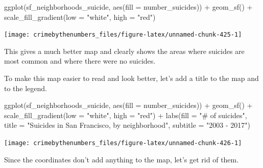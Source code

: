 \documentclass[
]{krantz}
\makeatletter
\newenvironment{Shaded}{\begin{snugshade}}{\end{snugshade}}
\newcommand{\AttributeTok}[1]{\textcolor[rgb]{0.61,0.61,0.61}{#1}}
\newcommand{\FunctionTok}[1]{\textcolor[rgb]{0,0,0}{#1}}
\newcommand{\NormalTok}[1]{#1}
\newcommand{\SpecialCharTok}[1]{\textcolor[rgb]{0,0,0}{#1}}
\newcommand{\StringTok}[1]{\textcolor[rgb]{0.5,0.5,0.5}{#1}}
\newenvironment{kframe}{%
\medskip{}
\setlength{\fboxsep}{.8em}
 \def\at@end@of@kframe{}%
 \ifinner\ifhmode%
  \def\at@end@of@kframe{\end{minipage}}%
  \begin{minipage}{\columnwidth}%
 \fi\fi%
 \def\FrameCommand##1{\hskip\@totalleftmargin \hskip-\fboxsep
 \colorbox{shadecolor}{##1}\hskip-\fboxsep
     \hskip-\linewidth \hskip-\@totalleftmargin \hskip\columnwidth}%
 \MakeFramed {\advance\hsize-\width
   \@totalleftmargin\z@ \linewidth\hsize
   \@setminipage}}%
 {\par\unskip\endMakeFramed%
 \at@end@of@kframe}
\renewenvironment{Shaded}{\begin{kframe}}{\end{kframe}}
\makeatother
\begin{document}
\begin{Shaded}
\begin{Highlighting}[]
\FunctionTok{ggplot}\NormalTok{(sf\_neighborhoods\_suicide, }\FunctionTok{aes}\NormalTok{(}\AttributeTok{fill =}\NormalTok{ number\_suicides)) }\SpecialCharTok{+}
  \FunctionTok{geom\_sf}\NormalTok{() }\SpecialCharTok{+}
  \FunctionTok{scale\_fill\_gradient}\NormalTok{(}\AttributeTok{low =} \StringTok{"white"}\NormalTok{, }\AttributeTok{high =} \StringTok{"red"}\NormalTok{) }
\end{Highlighting}
\end{Shaded}

\begin{center}\texttt{[image: crimebythenumbers\_files/figure-latex/unnamed-chunk-425-1]} \end{center}

This gives a much better map and clearly shows the areas where suicides are most common and where there were no suicides.

To make this map easier to read and look better, let's add a title to the map and to the legend.

\begin{Shaded}
\begin{Highlighting}[]
\FunctionTok{ggplot}\NormalTok{(sf\_neighborhoods\_suicide, }\FunctionTok{aes}\NormalTok{(}\AttributeTok{fill =}\NormalTok{ number\_suicides)) }\SpecialCharTok{+}
  \FunctionTok{geom\_sf}\NormalTok{() }\SpecialCharTok{+}
  \FunctionTok{scale\_fill\_gradient}\NormalTok{(}\AttributeTok{low =} \StringTok{"white"}\NormalTok{, }\AttributeTok{high =} \StringTok{"red"}\NormalTok{) }\SpecialCharTok{+}
  \FunctionTok{labs}\NormalTok{(}\AttributeTok{fill =} \StringTok{"\# of suicides"}\NormalTok{,}
       \AttributeTok{title =} \StringTok{"Suicides in San Francisco, by neighborhood"}\NormalTok{,}
       \AttributeTok{subtitle =} \StringTok{"2003 {-} 2017"}\NormalTok{) }
\end{Highlighting}
\end{Shaded}

\begin{center}\texttt{[image: crimebythenumbers\_files/figure-latex/unnamed-chunk-426-1]} \end{center}

Since the coordinates don't add anything to the map, let's get rid of them.
\end{document}

